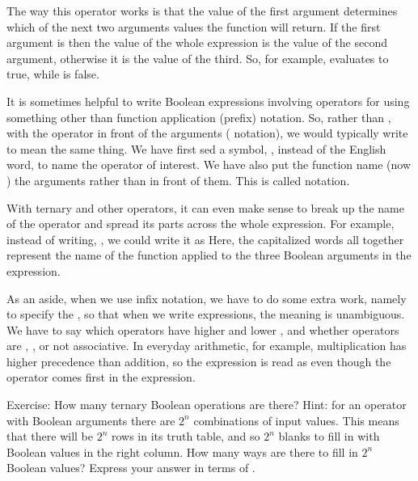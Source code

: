 \documentclass[letterpaper,10pt,english]{sphinxmanual}
\begin{document}
The way this operator works is that the value of the first argument
determines which of the next two arguments values the function will
return. If the first argument is  then the value of the whole
expression is the value of the second argument, otherwise it is the
value of the third. So, for example,  evaluates to true, while  is false.

It is sometimes helpful to write Boolean expressions involving 
operators for  using something other than function application
(prefix) notation. So, rather than , with the
operator in front of the arguments ( notation), we would
typically write  to mean the same thing. We have first
sed a symbol, \sphinxstyleemphasis{\&\&}, instead of the English word,  to name the
operator of interest. We have also put the function name (now \sphinxstyleemphasis{\&\&})
 the arguments rather than in front of them. This is called
 notation.

With ternary and other operators, it can even make sense to break up
the name of the operator and spread its parts across the whole
expression. For example, instead of writing, , we could write it as 
Here, the capitalized words all together represent the name of the
function applied to the three Boolean arguments in the expression.

As an aside, when we use infix notation, we have to do some extra
work, namely to specify the , so that when we
write expressions, the meaning is unambiguous. We have to say which
operators have higher and lower , and whether operators
are , , or not associative. In everyday arithmetic, for
example, multiplication has higher precedence than addition, so the
expression  is read as  even though the \sphinxstyleemphasis{+}
operator comes first in the expression.

Exercise: How many ternary Boolean operations are there? Hint: for an
operator with  Boolean arguments there are \(2^n\) combinations
of input values. This means that there will be \(2^n\) rows in its
truth table, and so \(2^n\) blanks to fill in with Boolean values
in the right column. How many ways are there to fill in \(2^n\)
Boolean values? Express your answer in terms of .
\end{document}
